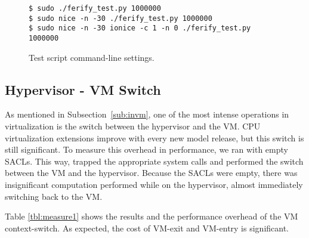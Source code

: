 \begin{figure}[ht]
	\centering
	\footnotesize{\selectfont 
		\begin{lstlisting}
$ sudo ./ferify_test.py 1000000
$ sudo nice -n -30 ./ferify_test.py 1000000
$ sudo nice -n -30 ionice -c 1 -n 0 ./ferify_test.py 1000000
	\end{lstlisting}}
	\caption{Test script command-line settings.}
	\label{fig:script}
\end{figure}


\subsection{Hypervisor - \ac{VM} Switch}

\par As mentioned in Subsection~\ref{sub:invm}, one of the most intense operations in virtualization is the switch between the hypervisor and the \ac{VM}. \ac{CPU} virtualization extensions improve with every new model release, but this switch is still significant. To measure this overhead in performance, we ran  with empty \acp{SACL}. This way,  trapped the appropriate system calls and performed the switch between the \ac{VM} and the hypervisor. Because the \acp{SACL} were empty, there was insignificant computation performed while on the hypervisor, almost immediately switching back to the \ac{VM}. 

\par Table \ref{tbl:measure1} shows the results and the performance overhead of the \ac{VM} context-switch. As expected, the cost of VM-exit and VM-entry is significant. 

